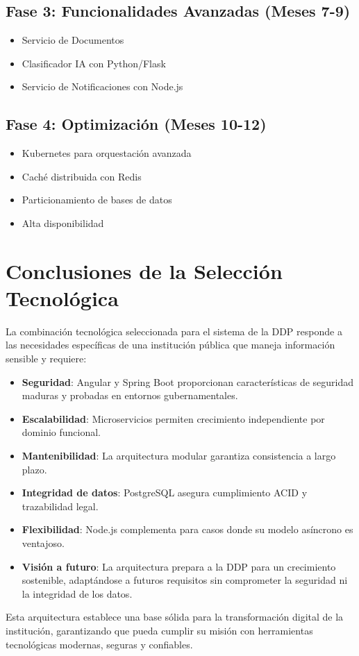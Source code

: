 \subsection{Fase 3: Funcionalidades Avanzadas (Meses 7-9)}
\begin{itemize}
    \item Servicio de Documentos
    \item Clasificador IA con Python/Flask
    \item Servicio de Notificaciones con Node.js
\end{itemize}

\subsection{Fase 4: Optimización (Meses 10-12)}
\begin{itemize}
    \item Kubernetes para orquestación avanzada
    \item Caché distribuida con Redis
    \item Particionamiento de bases de datos
    \item Alta disponibilidad
\end{itemize}

\section{Conclusiones de la Selección Tecnológica}

La combinación tecnológica seleccionada para el sistema de la DDP responde a las necesidades específicas de una institución pública que maneja información sensible y requiere:

\begin{itemize}
    \item \textbf{Seguridad}: Angular y Spring Boot proporcionan características de seguridad maduras y probadas en entornos gubernamentales.
    
    \item \textbf{Escalabilidad}: Microservicios permiten crecimiento independiente por dominio funcional.
    
    \item \textbf{Mantenibilidad}: La arquitectura modular garantiza consistencia a largo plazo.
    
    \item \textbf{Integridad de datos}: PostgreSQL asegura cumplimiento ACID y trazabilidad legal.
    
    \item \textbf{Flexibilidad}: Node.js complementa para casos donde su modelo asíncrono es ventajoso.
    
    \item \textbf{Visión a futuro}: La arquitectura prepara a la DDP para un crecimiento sostenible, adaptándose a futuros requisitos sin comprometer la seguridad ni la integridad de los datos.
\end{itemize}

Esta arquitectura establece una base sólida para la transformación digital de la institución, garantizando que pueda cumplir su misión con herramientas tecnológicas modernas, seguras y confiables.